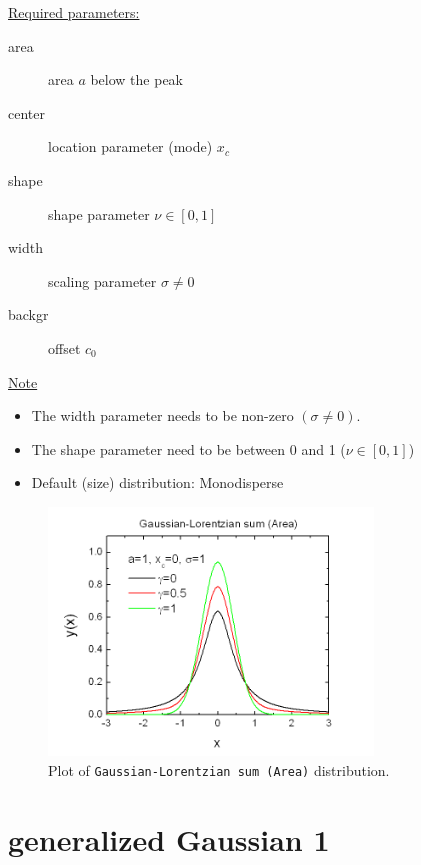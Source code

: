 \uline{Required parameters:}
\begin{description}
    \item[area] area $a$ below the peak
    \item[center] location parameter (mode) $x_c$
    \item[shape] shape parameter $\nu\in [0,1]$
    \item[width] scaling parameter $\sigma \neq 0$
    \item[backgr] offset $c_0$
\end{description}

\uline{Note}
\begin{itemize}
  \item The width parameter needs to be non-zero $(\sigma\neq 0)$.
  \item The shape parameter need to be between 0 and 1 ($\nu\in [0,1]$)
  \item Default (size) distribution: Monodisperse
\end{itemize}
\begin{figure}[htb]
\begin{center}
\includegraphics[width=0.768\textwidth]{GaussianLorentzianSumArea.png}
\end{center}
\caption{Plot of \texttt{Gaussian-Lorentzian sum (Area)} distribution.}
\label{fig:GaussianLorentzianSumArea}
\end{figure}

\clearpage
\section{generalized Gaussian 1} ~\\
\label{sec:generalizedGaussian1}

